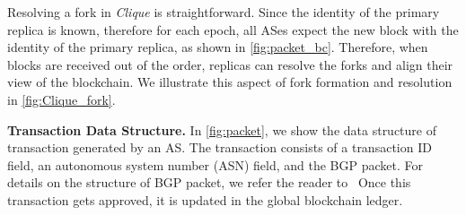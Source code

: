 \documentclass[conference]{IEEEtran}
\newcommand{\BfPara}[1]{{\noindent\bf#1.}\xspace}
\begin{document}
Resolving a fork in {\em Clique} is straightforward. Since the identity of the primary replica is known, therefore for each epoch, all ASes expect the new block with the identity of the primary replica, as shown in \autoref{fig:packet_bc}. Therefore, when blocks are received out of the order, replicas can resolve the forks and align their view of the blockchain. We illustrate this aspect of fork formation and resolution in \autoref{fig:Clique_fork}. 






\BfPara{Transaction Data Structure}\label{secc:tds}
In \autoref{fig:packet}, we show the data structure of transaction generated by an AS. The transaction consists of a transaction ID field, an autonomous system number (ASN) field, and the BGP packet. For details on the structure of BGP packet, we refer the reader to~\cite{rfc4271} Once this transaction gets approved, it is updated in the global blockchain ledger. 

\end{document}
